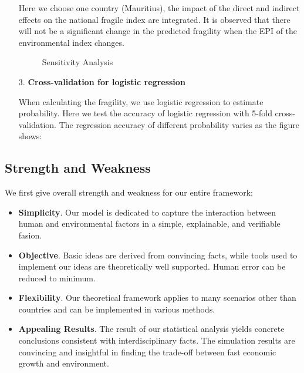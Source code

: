 \begin{itemize}
Here we choose one country (Mauritius), the impact of the direct and indirect effects on the national fragile index are integrated. It is observed that there will not be a significant change in the predicted fragility when the EPI of the environmental index changes.
\begin{figure}[htbp]
    \centering
    \caption{Sensitivity Analysis}
    \label{fig:exp:future}
\end{figure}
   
   \item[3.] \textbf{Cross-validation for logistic regression}

When calculating the fragility, we use logistic regression to estimate probability. Here we test the accuracy of logistic regression with 5-fold cross-validation. The regression accuracy of different probability varies as the figure shows:
\end{itemize}

\subsection{Strength and Weakness}
We first give overall strength and weakness for our entire framework:
\begin{itemize}
   \item \textbf{Simplicity}. Our model is dedicated to capture the interaction between human and environmental factors in a simple, explainable, and verifiable fasion.
   \item \textbf{Objective}. Basic ideas are derived from convincing facts, while tools used to implement our ideas are theoretically well supported. Human error can be reduced to minimum. 
   \item \textbf{Flexibility}. Our theoretical framework applies to many scenarios other than countries and can be implemented in various methods. 
   \item \textbf{Appealing Results}. The result of our statistical analysis yields concrete conclusions consistent with interdisciplinary facts. The simulation results are convincing and insightful in finding the trade-off between fast economic growth and environment.
\end{itemize}

